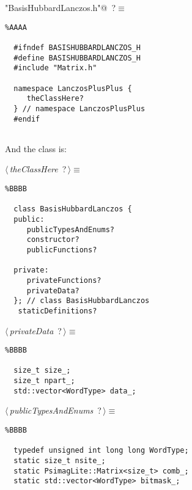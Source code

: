 \documentclass{report}
\begin{document}
\begin{flushleft} \small
\begin{minipage}{\linewidth}\label{scrap2}\raggedright\small
{} \verb@"BasisHubbardLanczos.h"@\nobreak\ {\footnotesize {?}}$\equiv$
\vspace{-1ex}
\begin{lstlisting}%AAAA
    
  #ifndef BASISHUBBARDLANCZOS_H  
  #define BASISHUBBARDLANCZOS_H  
  #include "Matrix.h"  
    
  namespace LanczosPlusPlus {  
  	 theClassHere?  
  } // namespace LanczosPlusPlus  
  #endif  
    
   \end{lstlisting}
\end{minipage}
\end{flushleft}
And the class is:
\begin{flushleft} \small
\begin{minipage}{\linewidth}\label{scrap3}\raggedright\small
{} $\langle\,${\it theClassHere}\nobreak\ {\footnotesize {?}}$\,\rangle\equiv$
\begin{lstlisting}%BBBB
    
  class BasisHubbardLanczos {  
  public:  
  	 publicTypesAndEnums?  
  	 constructor?  
  	 publicFunctions?  
    
  private:  
  	 privateFunctions?  
  	 privateData?  
  }; // class BasisHubbardLanczos  
   staticDefinitions?  
   \end{lstlisting}
\end{minipage}\vspace{4ex}
\end{flushleft}
\begin{flushleft} \small
\begin{minipage}{\linewidth}\label{scrap4}\raggedright\small
{} $\langle\,${\it privateData}\nobreak\ {\footnotesize {?}}$\,\rangle\equiv$
\begin{lstlisting}%BBBB
    
  size_t size_;  
  size_t npart_;  
  std::vector<WordType> data_;  
   \end{lstlisting}
\end{minipage}\vspace{4ex}
\end{flushleft}
\begin{flushleft} \small
\begin{minipage}{\linewidth}\label{scrap5}\raggedright\small
{} $\langle\,${\it publicTypesAndEnums}\nobreak\ {\footnotesize {?}}$\,\rangle\equiv$
\begin{lstlisting}%BBBB
    
  typedef unsigned int long long WordType;  
  static size_t nsite_;  
  static PsimagLite::Matrix<size_t> comb_;  
  static std::vector<WordType> bitmask_;  \end{lstlisting}
\end{minipage}\vspace{4ex}
\end{flushleft}
\end{document}
